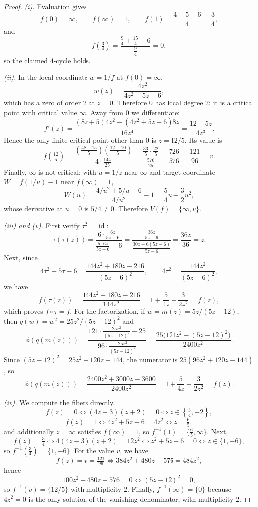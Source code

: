 \documentclass[12pt]{article}
\theoremstyle{definition}
\theoremstyle{remark}
\numberwithin{equation}{section}
\newcommand{\id}{\operatorname{id}}
\begin{document}
\begin{proof}
\emph{(i).}  Evaluation gives
\[
f(0)=\infty,\qquad f(\infty)=1,\qquad
f(1)=\frac{4+5-6}{4}=\frac34,
\]
and
\[
f\!\left(\tfrac34\right)
=\frac{\tfrac94+\tfrac{15}{4}-6}{\tfrac94}=0,
\]
so the claimed $4$-cycle holds.

\emph{(ii).}  In the local coordinate $w=1/f$ at $f(0)=\infty$,
\[
w(z)=\frac{4z^{2}}{4z^{2}+5z-6},
\]
which has a zero of order $2$ at $z=0$.  Therefore $0$ has local degree
$2$: it is a critical point with critical value $\infty$.  Away from
$0$ we differentiate:
\[
f'(z)=\frac{(8z+5)4z^{2}-(4z^{2}+5z-6)8z}{16z^{4}}
=\frac{12-5z}{4z^{3}}.
\]
Hence the only finite critical point other than $0$ is $z=12/5$.  Its
value is
\[
f\!\left(\tfrac{12}{5}\right)
=\frac{\left(\tfrac{48-15}{5}\right)\left(\tfrac{12+10}{5}\right)}
       {4\cdot\tfrac{144}{25}}
=\frac{\tfrac{33}{5}\cdot\tfrac{22}{5}}{\tfrac{576}{25}}
=\frac{726}{576}=\frac{121}{96}=v.
\]
Finally, $\infty$ is not critical: with $u=1/z$ near $\infty$ and target
coordinate $W=f(1/u)-1$ near $f(\infty)=1$,
\[
W(u)=\frac{4/u^{2}+5/u-6}{4/u^{2}}-1
=\frac{5}{4}u-\frac{3}{2}u^{2},
\]
whose derivative at $u=0$ is $5/4\neq0$.  Therefore
$V(f)=\{\infty,v\}$.

\emph{(iii) and (v).}  First verify $\tau^{2}=\id$:
\[
\tau(\tau(z))=\frac{6\cdot\tfrac{6z}{5z-6}}{\tfrac{5\cdot6z}{5z-6}-6}
=\frac{\tfrac{36z}{5z-6}}{\tfrac{30z-6(5z-6)}{5z-6}}
=\frac{36z}{36}=z.
\]
Next, since
\[
4\tau^{2}+5\tau-6
=\frac{144z^{2}+180z-216}{(5z-6)^{2}},
\qquad
4\tau^{2}=\frac{144z^{2}}{(5z-6)^{2}},
\]
we have
\[
f(\tau(z))=\frac{144z^{2}+180z-216}{144z^{2}}
=1+\frac{5}{4z}-\frac{3}{2z^{2}}=f(z),
\]
which proves $f\circ\tau=f$.  For the factorization, if
$w=m(z)=5z/(5z-12)$, then $q(w)=w^{2}=25z^{2}/(5z-12)^{2}$ and
\[
\phi(q(m(z)))
=\frac{121\cdot\tfrac{25z^{2}}{(5z-12)^{2}}-25}
       {96\cdot\tfrac{25z^{2}}{(5z-12)^{2}}}
=\frac{25\bigl(121z^{2}-(5z-12)^{2}\bigr)}{2400z^{2}}.
\]
Since $(5z-12)^{2}=25z^{2}-120z+144$, the numerator is
$25(96z^{2}+120z-144)$, so
\[
\phi(q(m(z)))=\frac{2400z^{2}+3000z-3600}{2400z^{2}}
=1+\frac{5}{4z}-\frac{3}{2z^{2}}=f(z).
\]

\emph{(iv).}  We compute the fibers directly.
\[
f(z)=0\iff (4z-3)(z+2)=0\iff z\in\left\{\tfrac34,-2\right\},
\]
\[
f(z)=1\iff 4z^{2}+5z-6=4z^{2}\iff z=\tfrac65,
\]
and additionally $z=\infty$ satisfies $f(\infty)=1$, so
$f^{-1}(1)=\{\tfrac65,\infty\}$.  Next,
\[
f(z)=\tfrac34\iff 4(4z-3)(z+2)=12z^{2}
\iff z^{2}+5z-6=0\iff z\in\{1,-6\},
\]
so $f^{-1}(\tfrac34)=\{1,-6\}$.  For the value $v$, we have
\[
f(z)=v=\tfrac{121}{96}
\iff 384z^{2}+480z-576=484z^{2},
\]
hence
\[
100z^{2}-480z+576=0
\iff (5z-12)^{2}=0,
\]
so $f^{-1}(v)=\{12/5\}$ with multiplicity $2$.  Finally,
$f^{-1}(\infty)=\{0\}$ because $4z^{2}=0$ is the only solution of the
vanishing denominator, with multiplicity $2$.
\end{proof}
\end{document}
